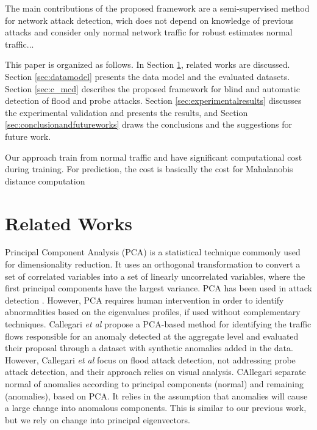 \documentclass[review]{elsarticle}
\begin{document}
The main contributions of the proposed framework are a semi-supervised method for network attack detection, wich does not depend on knowledge of previous attacks and consider only normal network traffic for robust estimates normal traffic...

This paper is organized as follows. In Section \ref{sec:relatedworks}, related works are discussed. Section \ref{sec:datamodel} presents the data model and the evaluated datasets. Section \ref{sec:c_mcd} describes the proposed framework for blind and automatic detection of flood and probe attacks. Section \ref{sec:experimentalresults} discusses the experimental validation and presents the results, and Section \ref{sec:conclusionandfutureworks} draws the conclusions and the suggestions for future work.

Our approach train from normal traffic and have significant computational cost during training. For prediction, the cost is basically the cost for Mahalanobis distance computation

\section{Related Works}
\label{sec:relatedworks}

Principal Component Analysis (PCA) is a statistical technique commonly used for dimensionality reduction. It uses an orthogonal transformation to convert a set of correlated variables into a set of linearly uncorrelated variables, where the first principal components have the largest variance. PCA has been used in attack detection \cite{almotairi2009technique}. However, PCA requires human intervention in order to identify abnormalities based on the eigenvalues profiles, if used without complementary techniques. Callegari \emph{et al} \cite{callegari2011novel} propose a PCA-based method for identifying the traffic flows responsible for an anomaly detected at the aggregate level and evaluated their proposal through a dataset with synthetic anomalies added in the data. However, Callegari \emph{et al} focus on flood attack detection, not addressing probe attack detection, and their approach relies on visual analysis. CAllegari separate normal of anomalies according to principal components (normal) and remaining (anomalies), based on PCA. It relies in the assumption that anomalies will cause a large change into anomalous components. This is similar to our previous work, but we rely on change into principal eigenvectors.
\end{document}
